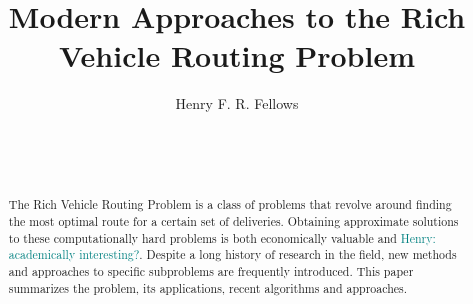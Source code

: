 \documentclass{sig-alternate}
\newcommand{\allcomments}[1]{{#1}}
\newcommand{\hfcomment}[1]{\textcolor{Teal}{\allcomments{Henry: {#1}}}}
\begin{document}

\title{Modern Approaches to the Rich Vehicle Routing Problem}


\author{
\alignauthor
Henry F. R. Fellows\\
	\\
	\\
	\\
}

\maketitle
\begin{abstract}

The Rich Vehicle Routing Problem is a class of problems that revolve around finding the most optimal route for a certain set of deliveries. Obtaining approximate solutions to these computationally hard problems is both economically valuable and \hfcomment{academically interesting?}. Despite a long history of research in the field, new methods and approaches to specific subproblems are frequently introduced. This paper summarizes the problem, its applications, recent algorithms and approaches.


\end{abstract}
\end{document}
